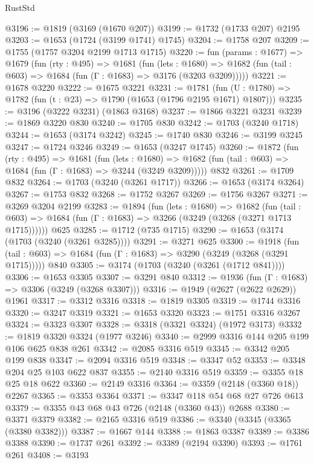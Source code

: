 \begin{lexlean}{RustStd}
\begin{coremodule}
@3196 := @1819 (@3169 (@1670 @207))
@3199 := @1732 (@1733 @207) @2195
@3203 := @1653 (@1724 (@3199 @1741) @1745)
@3204 := @1758 @207
@3209 := @1755 (@1757 @3204 @2199 @1713 @1715)
@3220 := fun (params : @1677) =>
  @1679
    (fun (rty : @495) =>
    @1681
      (fun (lets : @1680) =>
      @1682 (fun (tail : @603) => @1684 (fun (Γ : @1683) => @3176 (@3203 @3209)))))
@3221 := @1678 @3220
@3222 := @1675 @3221
@3231 := @1781 (fun (U : @1780) => @1782 (fun (t : @23) => @1790 (@1653 (@1796 @2195 @1671) @1807)))
@3235 := @3196 (@3222 @3231) (@1863 @3168)
@3237 := @1866 @3221 @3231
@3239 := @1869 @3220 @830
@3240 := @1705 @830
@3242 := @1703 (@3240 @1718)
@3244 := @1653 (@3174 @3242)
@3245 := @1740 @830
@3246 := @3199 @3245
@3247 := @1724 @3246
@3249 := @1653 (@3247 @1745)
@3260 := @1872
    (fun (rty : @495) =>
    @1681
      (fun (lets : @1680) =>
      @1682 (fun (tail : @603) => @1684 (fun (Γ : @1683) => @3244 (@3249 @3209)))))
    @832
@3261 := @1709 @832
@3264 := @1703 (@3240 (@3261 @1717))
@3266 := @1653 (@3174 @3264)
@3267 := @1753 @832
@3268 := @1752 @3267
@3269 := @1756 @3267
@3271 := @3269 @3204 @2199
@3283 := @1894
    (fun (lets : @1680) =>
    @1682
      (fun (tail : @603) => @1684 (fun (Γ : @1683) => @3266 (@3249 (@3268 (@3271 @1713 @1715))))))
    @625
@3285 := @1712 (@735 @1715)
@3290 := @1653 (@3174 (@1703 (@3240 (@3261 @3285))))
@3291 := @3271 @625
@3300 := @1918
    (fun (tail : @603) => @1684 (fun (Γ : @1683) => @3290 (@3249 (@3268 (@3291 @1715)))))
    @840
@3305 := @3174 (@1703 (@3240 (@3261 (@1712 @841))))
@3306 := @1653 @3305
@3307 := @3291 @840
@3312 := @1936 (fun (Γ : @1683) => @3306 (@3249 (@3268 @3307)))
@3316 := @1949 (@2627 (@2622 @2629)) @1961
@3317 := @3312 @3316
@3318 := @1819 @3305
@3319 := @1744 @3316
@3320 := @3247 @3319
@3321 := @1653 @3320
@3323 := @1751 @3316 @3267
@3324 := @3323 @3307
@3328 := @3318 (@3321 @3324) (@1972 @3173)
@3332 := @1819 @3320 @3324 (@1977 @3246)
@3340 := @2999 @3316 @144 @205 @199 @106 @625 @838 @261
@3342 := @2085 @3316 @519
@3345 := @3342 @205 @199 @838
@3347 := @2094 @3316 @519
@3348 := @3347 @52
@3353 := @3348 @204 @25 @103 @622 @837
@3355 := @2140 @3316 @519
@3359 := @3355 @18 @25 @18 @622
@3360 := @2149 @3316
@3364 := @3359 (@2148 (@3360 @18)) @2267
@3365 := @3353 @3364
@3371 := @3347 @118 @54 @68 @27 @726 @613
@3379 := @3355 @43 @68 @43 @726 (@2148 (@3360 @43)) @2688
@3380 := @3371 @3379
@3382 := @2165 @3316 @519
@3386 := @3340 (@3345 (@3365 (@3380 @3382)))
@3387 := @1667 @144
@3388 := @1863 @3387
@3389 := @3386 @3388
@3390 := @1737 @261
@3392 := @3389 (@2194 @3390)
@3393 := @1761 @261
@3408 := @3193

\end{coremodule}
\end{lexlean}
